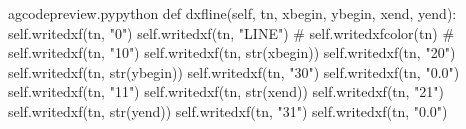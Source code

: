 \documentclass{ltxdoc}
\begin{document}
%

\lstset{firstnumber=\thegcpy}
\begin{writecode}{a}{gcodepreview.py}{python}
    def dxfline(self, tn, xbegin, ybegin, xend, yend):
        self.writedxf(tn, "0")
        self.writedxf(tn, "LINE")
#
        self.writedxfcolor(tn)
#
        self.writedxf(tn, "10")
        self.writedxf(tn, str(xbegin))
        self.writedxf(tn, "20")
        self.writedxf(tn, str(ybegin))
        self.writedxf(tn, "30")
        self.writedxf(tn, "0.0")
        self.writedxf(tn, "11")
        self.writedxf(tn, str(xend))
        self.writedxf(tn, "21")
        self.writedxf(tn, str(yend))
        self.writedxf(tn, "31")
        self.writedxf(tn, "0.0")

\end{writecode}
\addtocounter{gcpy}{19}
\end{document}
